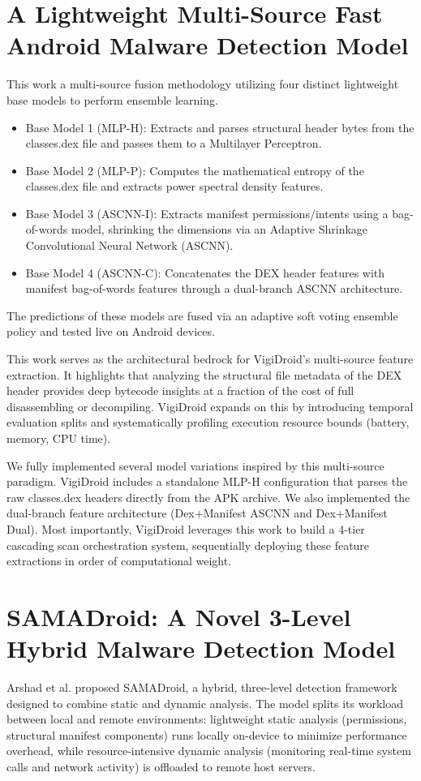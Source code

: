 \section{A Lightweight Multi-Source Fast Android Malware Detection Model }
This work \cite{msfdroid} a multi-source fusion methodology utilizing four distinct lightweight base models to perform ensemble learning.
\begin{itemize}
    \item 
Base Model 1 (MLP-H): Extracts and parses structural header bytes from the classes.dex file and passes them to a Multilayer Perceptron.
\item Base Model 2 (MLP-P): Computes the mathematical entropy of the classes.dex file and extracts power spectral density features.
\item Base Model 3 (ASCNN-I): Extracts manifest permissions/intents using a bag-of-words model, shrinking the dimensions via an Adaptive Shrinkage Convolutional Neural Network (ASCNN).
 \item Base Model 4 (ASCNN-C): Concatenates the DEX header features with manifest bag-of-words features through a dual-branch ASCNN architecture.
\end{itemize}
The predictions of these models are fused via an adaptive soft voting ensemble policy and tested live on Android devices.

 This work serves as the architectural bedrock for VigiDroid’s multi-source feature extraction. It highlights that analyzing the structural file metadata of the DEX header provides deep bytecode insights at a fraction of the cost of full disassembling or decompiling. VigiDroid expands on this by introducing temporal evaluation splits and systematically profiling execution resource bounds (battery, memory, CPU time).

 We fully implemented several model variations inspired by this multi-source paradigm. VigiDroid includes a standalone MLP-H configuration that parses the raw classes.dex headers directly from the APK archive. We also implemented the dual-branch feature architecture (Dex+Manifest ASCNN and Dex+Manifest Dual). Most importantly, VigiDroid leverages this work to build a 4-tier cascading scan orchestration system, sequentially deploying these feature extractions in order of computational weight.

\section{ SAMADroid: A Novel 3-Level Hybrid Malware Detection Model}
 Arshad et al. proposed\cite{samadroid} SAMADroid, a hybrid, three-level detection framework designed to combine static and dynamic analysis. The model splits its workload between local and remote environments: lightweight static analysis (permissions, structural manifest components) runs locally on-device to minimize performance overhead, while resource-intensive dynamic analysis (monitoring real-time system calls and network activity) is offloaded to remote host servers.\\

